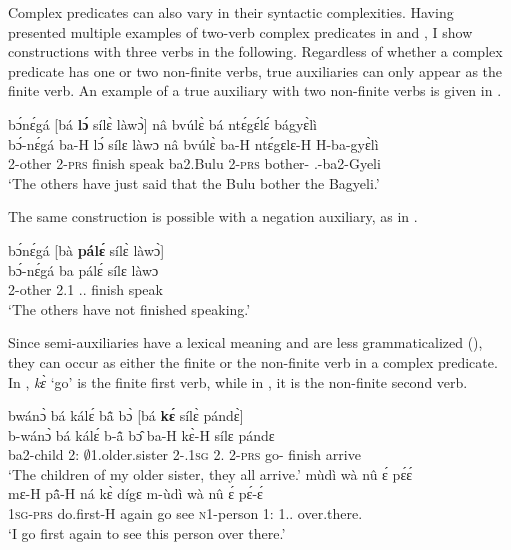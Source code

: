 Complex predicates can also vary in their syntactic complexities.
 Having presented multiple examples of two-verb complex predicates in  and , I show constructions with three verbs  in the following.
Regardless of whether a complex predicate has one or two non-finite verbs, true auxiliaries can only appear as the finite verb. 
An example of a true auxiliary with two non-finite verbs is given in .

\ea\label{lo7}
  \glll bɔ́nɛ́gá [bá {\bfseries lɔ́} sílɛ̀ làwɔ̀] nâ bvúlɛ̀ bá ntɛ́gɛ́lɛ́ bágyɛ̀lì \\
      bɔ́-nɛ́gá {\db}ba-H lɔ́ sílɛ làwɔ nâ bvúlɛ̀ ba-H ntɛ́gɛlɛ-H H-ba-gyɛ̀lì \\
        2-other {\db}2-\textsc{prs} {\RETRO}  finish speak {\COMP} ba2.Bulu 2-\textsc{prs} bother-{\R} {\OBJ}.{\LINK}-ba2-Gyeli\\
    \trans `The others have just said that the Bulu bother the Bagyeli.'
\z

\noindent The same construction is possible with a negation auxiliary, as in .

\ea\label{lo8}
  \glll bɔ́nɛ́gá [bà {\bfseries pálɛ́} sílɛ̀ làwɔ̀] \\
      bɔ́-nɛ́gá {\db}ba pálɛ́ sílɛ làwɔ \\
        2-other {\db}2.{\PST}1 {\NEG}.{\PST}.{\R}  finish speak\\
    \trans `The others have not finished speaking.'
\z

Since semi-auxiliaries have a lexical meaning and are less grammaticalized (), they can occur as either the finite or the non-finite verb in a complex predicate. In , {\itshape kɛ̀} `go' is the finite first verb, while in , it is the non-finite second verb.

\ea\label{3AUX5}
  \glll  bwánɔ̀ bá kálɛ́ bã̂ bɔ̀ [bá {\bfseries kɛ́} sílɛ̀ pándɛ̀] \\
          b-wánɔ̀ bá kálɛ́ b-ã̂ bɔ̂ {\db}ba-H kɛ̀-H sílɛ pándɛ \\
         ba2-child 2:{\ATT} $\emptyset$1.older.sister 2-{\POSS}.1\textsc{sg} 2.{\OBJ} {\db}2-\textsc{prs} go-{\R} finish arrive\\
    \trans `The children of my older sister, they all arrive.'
\ex\label{ke6}
   mùdì wà nû ɛ́ pɛ́ɛ́ \\
        {\db}mɛ-H pã̂-H ná kɛ̀ dígɛ m-ùdì wà nû ɛ́ pɛ́-ɛ́ \\
        {\db}1\textsc{sg}-\textsc{prs} do.first-H again go see \textsc{n}1-person 1:{\ATT} 1.{\DEM}.{\PROX} {\LOC} over.there.{\DIST} \\
    \trans `I go first again to see this person over there.'
\z

